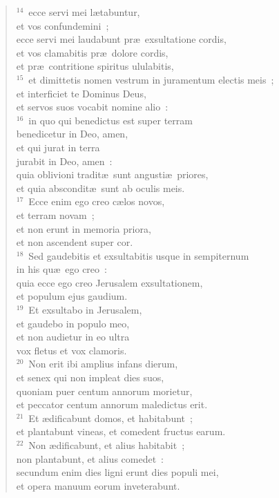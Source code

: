 \begin{flushleft}
\begin{verse}
${}^{14}$~ecce servi mei l\ae tabuntur,\\ et vos confundemini~;\\ ecce servi mei laudabunt pr\ae\ exsultatione cordis,\\ et vos clamabitis pr\ae\ dolore cordis,\\ et pr\ae\ contritione spiritus ululabitis,\\
${}^{15}$~et dimittetis nomen vestrum in juramentum electis meis~;\\ et interficiet te Dominus Deus,\\ et servos suos vocabit nomine alio~:\\
${}^{16}$~in quo qui benedictus est super terram\\ benedicetur in Deo, amen,\\ et qui jurat in terra\\ jurabit in Deo, amen~:\\ quia oblivioni tradit\ae\ sunt angusti\ae\ priores,\\ et quia abscondit\ae\ sunt ab oculis meis.\\
${}^{17}$~Ecce enim ego creo c\ae los novos,\\ et terram novam~;\\ et non erunt in memoria priora,\\ et non ascendent super cor.\\
${}^{18}$~Sed gaudebitis et exsultabitis usque in sempiternum\\ in his qu\ae\ ego creo~:\\ quia ecce ego creo Jerusalem exsultationem,\\ et populum ejus gaudium.\\
${}^{19}$~Et exsultabo in Jerusalem,\\ et gaudebo in populo meo,\\ et non audietur in eo ultra\\ vox fletus et vox clamoris.\\
${}^{20}$~Non erit ibi amplius infans dierum,\\ et senex qui non impleat dies suos,\\ quoniam puer centum annorum morietur,\\ et peccator centum annorum maledictus erit.\\
${}^{21}$~Et \ae dificabunt domos, et habitabunt~;\\ et plantabunt vineas, et comedent fructus earum.\\
${}^{22}$~Non \ae dificabunt, et alius habitabit~;\\ non plantabunt, et alius comedet~:\\ secundum enim dies ligni erunt dies populi mei,\\ et opera manuum eorum inveterabunt.\\

\end{verse}
\end{flushleft}
